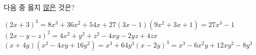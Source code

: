 다음 중 옳지 \underline{않은} 것은?
\begin{choicesv}{$(2x+3)^3=8x^3+36x^2+54x+27$}{$(3x-1)(9x^2+3x+1)=27x^3-1$}{$(2x-y-z)^2=4x^2+y^2+z^2-4xy-2yz+4zx$}{$(x+4y)(x^2-4xy+16y^2)=x^3+64y^3$}{$(x-2y)^3=x^3-6x^2y+12xy^2-8y^3$}\end{choicesv}
